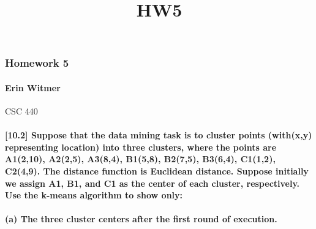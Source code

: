 \documentclass[11pt]{article}
\title{HW5}
\begin{document}
    
    
    \maketitle
    
    

    
    \subsubsection{Homework 5}\label{homework-5}

    \paragraph{Erin Witmer}\label{erin-witmer}

CSC 440

    \paragraph{{[}10.2{]} Suppose that the data mining task is to cluster
points (with(x,y) representing location) into three clusters, where the
points are A1(2,10), A2(2,5), A3(8,4), B1(5,8), B2(7,5), B3(6,4),
C1(1,2), C2(4,9). The distance function is Euclidean distance. Suppose
initially we assign A1, B1, and C1 as the center of each cluster,
respectively. Use the k-means algorithm to show
only:}\label{suppose-that-the-data-mining-task-is-to-cluster-points-withxy-representing-location-into-three-clusters-where-the-points-are-a1210-a225-a384-b158-b275-b364-c112-c249.-the-distance-function-is-euclidean-distance.-suppose-initially-we-assign-a1-b1-and-c1-as-the-center-of-each-cluster-respectively.-use-the-k-means-algorithm-to-show-only}

    \paragraph{(a) The three cluster centers after the first round of
execution.}\label{a-the-three-cluster-centers-after-the-first-round-of-execution.}
\end{document}
